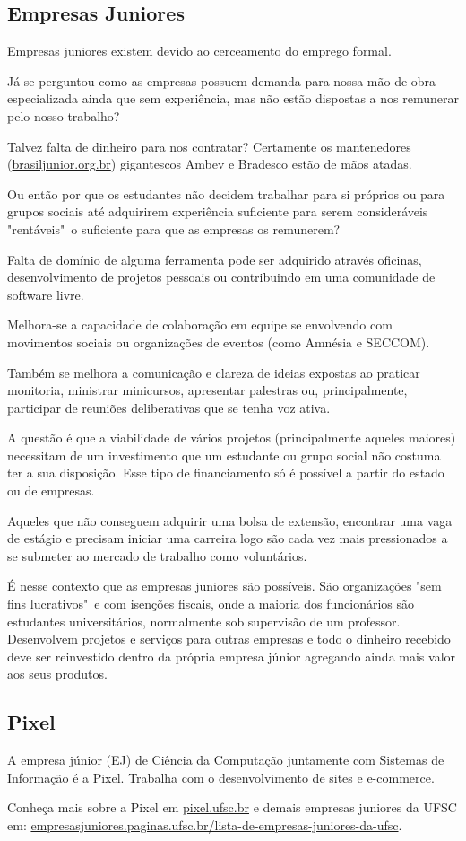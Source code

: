 \subsection{Empresas Juniores}

Empresas juniores existem devido ao cerceamento do emprego formal.

Já se perguntou como as empresas possuem demanda para nossa mão de obra especializada ainda que sem experiência, mas não estão dispostas a nos remunerar pelo nosso trabalho?

Talvez falta de dinheiro para nos contratar?
Certamente os mantenedores (\href{https://brasiljunior.org.br/}{brasiljunior.org.br}) gigantescos Ambev e Bradesco estão de mãos atadas. 

Ou então por que os estudantes não decidem trabalhar para si próprios ou para grupos sociais até adquirirem experiência suficiente para serem consideráveis "rentáveis"\ o suficiente para que as empresas os remunerem? 

Falta de domínio de alguma ferramenta pode ser adquirido através oficinas, desenvolvimento de projetos pessoais ou contribuindo em uma comunidade de software livre.

Melhora-se a capacidade de colaboração em equipe se envolvendo com movimentos sociais ou organizações de eventos (como Amnésia e SECCOM).

Também se melhora a comunicação e clareza de ideias expostas ao praticar monitoria, ministrar minicursos, apresentar palestras ou, principalmente, participar de reuniões deliberativas que se tenha voz ativa.

A questão é que a viabilidade de vários projetos (principalmente aqueles maiores) necessitam de um investimento que um estudante ou grupo social não costuma ter a sua disposição. Esse tipo de financiamento só é possível a partir do estado ou de empresas.

Aqueles que não conseguem adquirir uma bolsa de extensão, encontrar uma vaga de estágio e precisam iniciar uma carreira logo são cada vez mais pressionados a se submeter ao mercado de trabalho como voluntários.

É nesse contexto que as empresas juniores são possíveis.
São organizações "sem fins lucrativos"\ e com isenções fiscais, onde a maioria dos funcionários são estudantes universitários, normalmente sob supervisão de um professor.
Desenvolvem projetos e serviços para outras empresas e todo o dinheiro recebido deve ser reinvestido dentro da própria empresa júnior agregando ainda mais valor aos seus produtos.

\subsection{Pixel}

A empresa júnior (EJ) de Ciência da Computação juntamente com Sistemas de Informação é a Pixel.
Trabalha com o desenvolvimento de sites e e-commerce.

Conheça mais sobre a Pixel em \href{pixel.ufsc.br}{pixel.ufsc.br} e demais empresas juniores da UFSC em: \href{https://empresasjuniores.paginas.ufsc.br/lista-de-empresas-juniores-da-ufsc/}{empresasjuniores.paginas.ufsc.br/lista-de-empresas-juniores-da-ufsc}.
